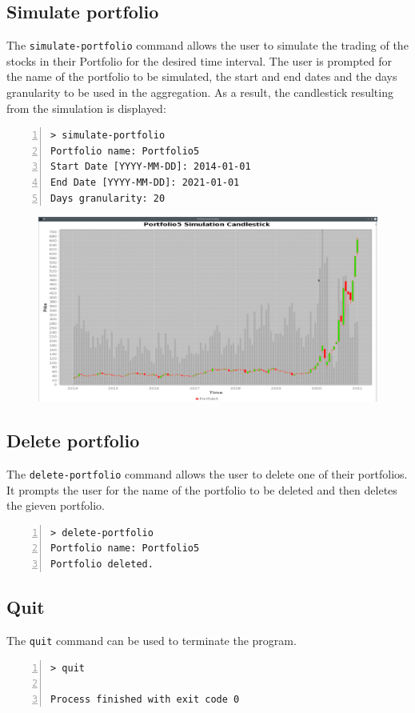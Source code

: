 \subsection{Simulate portfolio}
The \texttt{simulate-portfolio} command allows the user to simulate the trading
of the stocks in their Portfolio for the desired time interval. The user is
prompted for the name of the portfolio to be simulated, the start and end dates
and the days granularity to be used in the aggregation. As a result, the
candlestick resulting from the simulation is displayed:
\begin{lstlisting}[basicstyle=\footnotesize\ttfamily,language={},numbers=left,keepspaces=true,tabsize=4,
numberstyle=\footnotesize,numbersep=8pt,frame=single]
> simulate-portfolio
Portfolio name: Portfolio5
Start Date [YYYY-MM-DD]: 2014-01-01
End Date [YYYY-MM-DD]: 2021-01-01
Days granularity: 20
\end{lstlisting}
\vspace{-0.6cm}
\begin{figure}[H]
	\begin{center}
        \hspace*{-2.5cm}
		\includegraphics[scale=0.33]{img/user_manual/simulate_portfolio.png}
	\end{center}
\end{figure}
\subsection{Delete portfolio}
The \texttt{delete-portfolio} command allows the user to delete one of their
portfolios. It prompts the user for the name of the portfolio to be deleted and
then deletes the gieven portfolio.
\begin{lstlisting}[basicstyle=\footnotesize\ttfamily,language={},numbers=left,keepspaces=true,tabsize=4,
numberstyle=\footnotesize,numbersep=8pt,frame=single]
> delete-portfolio
Portfolio name: Portfolio5
Portfolio deleted.
\end{lstlisting}
\subsection{Quit}
The \texttt{quit} command can be used to terminate the program.
\begin{lstlisting}[basicstyle=\footnotesize\ttfamily,language={},numbers=left,keepspaces=true,tabsize=4,
numberstyle=\footnotesize,numbersep=8pt,frame=single]
> quit

Process finished with exit code 0
\end{lstlisting}
